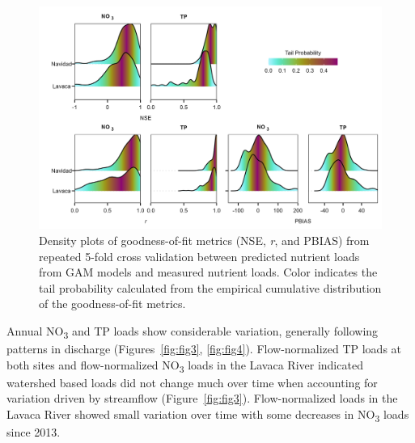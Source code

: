 \documentclass[sn-basic,referee,lineno,pdflatex]{sn-jnl}
\begin{document}
\begin{figure}

{\centering \includegraphics[width=1\linewidth,]{Schramm-2023-05-AS_files/figure-latex/fig2-1} 

}

\caption{Density plots of goodness-of-fit metrics (NSE, \textit{r}, and PBIAS) from repeated 5-fold cross validation between predicted nutrient loads from GAM models and measured nutrient loads. Color indicates the tail probability calculated from the empirical cumulative distribution of the goodness-of-fit metrics.}\label{fig:fig2}
\end{figure}

Annual NO\textsubscript{3} and TP loads show considerable variation,
generally following patterns in discharge (Figures~\ref{fig:fig3},
\ref{fig:fig4}). Flow-normalized TP loads at both sites and
flow-normalized NO\textsubscript{3} loads in the Lavaca River indicated
watershed based loads did not change much over time when accounting for
variation driven by streamflow (Figure~\ref{fig:fig3}). Flow-normalized
loads in the Lavaca River showed small variation over time with some
decreases in NO\textsubscript{3} loads since 2013.
\end{document}
